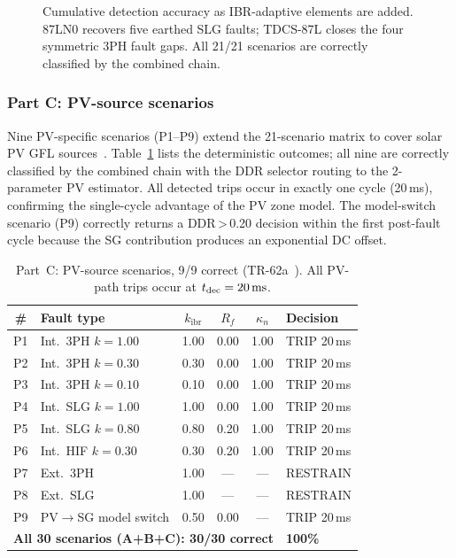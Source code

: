 \documentclass[journal,twoside,10pt]{IEEEtran}
\newcommand{\kibr}{k_{\mathrm{ibr}}}
\newcommand{\kn}{\kappa_n}
\begin{document}
\begin{figure}[!t]
  \centering
  
  \caption{Cumulative detection accuracy as IBR-adaptive elements are added.
           87LN0 recovers five earthed SLG faults; TDCS-87L closes the
           four symmetric 3PH fault gaps.  All 21/21 scenarios are
           correctly classified by the combined chain.}
  \label{fig:improvement}
\end{figure}

\subsubsection{Part C: PV-source scenarios}

Nine PV-specific scenarios (P1--P9) extend the 21-scenario matrix to cover
solar PV GFL sources~\cite{SAMBP_TR62}.  Table~\ref{tab:pv_results} lists
the deterministic outcomes; all nine are correctly classified by the combined
chain with the DDR selector routing to the 2-parameter PV estimator.
All detected trips occur in exactly one cycle (20\,ms), confirming the
single-cycle advantage of the PV zone model.
The model-switch scenario (P9) correctly returns a DDR\,>\,0.20 decision
within the first post-fault cycle because the SG contribution produces an
exponential DC offset.

\begin{table}[!t]
\centering
\caption{Part~C: PV-source scenarios, 9/9 correct (TR-62a~\cite{SAMBP_TR62}).
         All PV-path trips occur at $t_{\rm dec}=20\,\text{ms}$.}
\label{tab:pv_results}
\renewcommand{\arraystretch}{1.05}
\setlength{\tabcolsep}{3.5pt}
\begin{tabular}{clcccl}
\toprule
\# & Fault type & $\kibr$ & $R_f$ & $\kn$ & Decision \\
\midrule
P1 & Int.\ 3PH $k{=}1.00$     & 1.00 & 0.00 & 1.00 & TRIP 20\,ms \\
P2 & Int.\ 3PH $k{=}0.30$     & 0.30 & 0.00 & 1.00 & TRIP 20\,ms \\
P3 & Int.\ 3PH $k{=}0.10$     & 0.10 & 0.00 & 1.00 & TRIP 20\,ms \\
P4 & Int.\ SLG $k{=}1.00$     & 1.00 & 0.00 & 1.00 & TRIP 20\,ms \\
P5 & Int.\ SLG $k{=}0.80$     & 0.80 & 0.20 & 1.00 & TRIP 20\,ms \\
P6 & Int.\ HIF $k{=}0.30$     & 0.30 & 0.20 & 1.00 & TRIP 20\,ms \\
P7 & Ext.\ 3PH                & 1.00 & ---  & ---  & RESTRAIN \\
P8 & Ext.\ SLG                & 1.00 & ---  & ---  & RESTRAIN \\
P9 & PV$\to$SG model switch   & 0.50 & 0.00 & ---  & TRIP 20\,ms \\
\midrule
\multicolumn{5}{l}{\textbf{All 30 scenarios (A+B+C): 30/30 correct}} & \textbf{100\%} \\
\bottomrule
\end{tabular}
\end{table}
\end{document}
